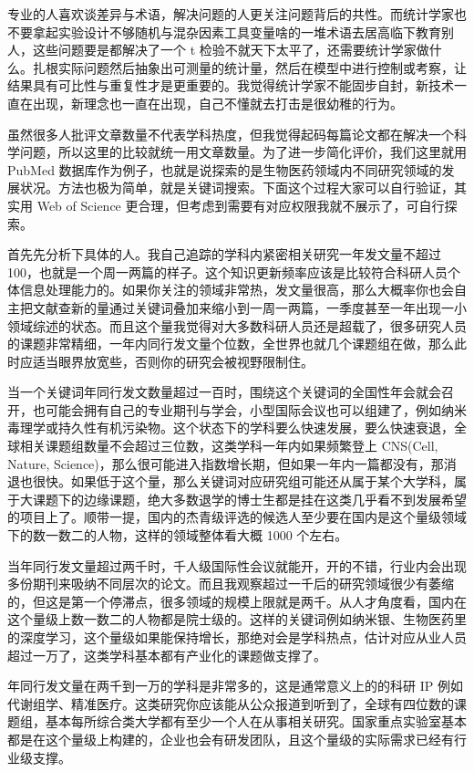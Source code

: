 \documentclass[]{tufte-book}
\begin{document}
专业的人喜欢谈差异与术语，解决问题的人更关注问题背后的共性。而统计学家也不要拿起实验设计不够随机与混杂因素工具变量啥的一堆术语去居高临下教育别人，这些问题要是都解决了一个 t 检验不就天下太平了，还需要统计学家做什么。扎根实际问题然后抽象出可测量的统计量，然后在模型中进行控制或考察，让结果具有可比性与重复性才是更重要的。我觉得统计学家不能固步自封，新技术一直在出现，新理念也一直在出现，自己不懂就去打击是很幼稚的行为。

虽然很多人批评文章数量不代表学科热度，但我觉得起码每篇论文都在解决一个科学问题，所以这里的比较就统一用文章数量。为了进一步简化评价，我们这里就用 PubMed 数据库作为例子，也就是说探索的是生物医药领域内不同研究领域的发展状况。方法也极为简单，就是关键词搜索。下面这个过程大家可以自行验证，其实用 Web of Science 更合理，但考虑到需要有对应权限我就不展示了，可自行探索。

首先先分析下具体的人。我自己追踪的学科内紧密相关研究一年发文量不超过 100，也就是一个周一两篇的样子。这个知识更新频率应该是比较符合科研人员个体信息处理能力的。如果你关注的领域非常热，发文量很高，那么大概率你也会自主把文献查新的量通过关键词叠加来缩小到一周一两篇，一季度甚至一年出现一小领域综述的状态。而且这个量我觉得对大多数科研人员还是超载了，很多研究人员的课题非常精细，一年内同行发文量个位数，全世界也就几个课题组在做，那么此时应适当眼界放宽些，否则你的研究会被视野限制住。

当一个关键词年同行发文数量超过一百时，围绕这个关键词的全国性年会就会召开，也可能会拥有自己的专业期刊与学会，小型国际会议也可以组建了，例如纳米毒理学或持久性有机污染物。这个状态下的学科要么快速发展，要么快速衰退，全球相关课题组数量不会超过三位数，这类学科一年内如果频繁登上 CNS(Cell, Nature, Science)，那么很可能进入指数增长期，但如果一年内一篇都没有，那消退也很快。如果低于这个量，那么关键词对应研究组可能还从属于某个大学科，属于大课题下的边缘课题，绝大多数退学的博士生都是挂在这类几乎看不到发展希望的项目上了。顺带一提，国内的杰青级评选的候选人至少要在国内是这个量级领域下的数一数二的人物，这样的领域整体看大概 1000 个左右。

当年同行发文量超过两千时，千人级国际性会议就能开，开的不错，行业内会出现多份期刊来吸纳不同层次的论文。而且我观察超过一千后的研究领域很少有萎缩的，但这是第一个停滞点，很多领域的规模上限就是两千。从人才角度看，国内在这个量级上数一数二的人物都是院士级的。这样的关键词例如纳米银、生物医药里的深度学习，这个量级如果能保持增长，那绝对会是学科热点，估计对应从业人员超过一万了，这类学科基本都有产业化的课题做支撑了。

年同行发文量在两千到一万的学科是非常多的，这是通常意义上的的科研 IP 例如代谢组学、精准医疗。这类研究你应该能从公众报道到听到了，全球有四位数的课题组，基本每所综合类大学都有至少一个人在从事相关研究。国家重点实验室基本都是在这个量级上构建的，企业也会有研发团队，且这个量级的实际需求已经有行业级支撑。
\end{document}
